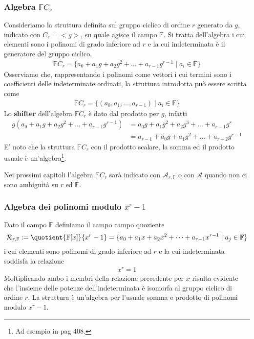 \subsubsection{Algebra $\mathbb{F}C_{r}$}
Consideriamo la struttura definita sul gruppo ciclico di ordine
$r$ generato da $g$, indicato con $C_{r} = < g >$, su quale agisce il campo
$\mathbb{F}$. 
Si tratta dell'algebra i cui elementi sono i polinomi di grado
inferiore ad $r$ e la cui indeterminata è il generatore del gruppo ciclico.
\begin{align*}
\mathbb{F}C_{r} = \lbrace
a_0 + a_1 g + a_2 g^2 + \dots + a_{r-1} g^{r-1}
\mid a_{i} \in \mathbb{F}
\rbrace
\end{align*}
Osserviamo che, rappresentando i polinomi come vettori i cui
termini sono i coefficienti delle indeterminate ordinati, la
struttura introdotta può essere scritta come
\begin{align*}
\mathbb{F}C_r = \lbrace (a_0, a_1, \dots, a_{r-1} ) \mid a_{i} \in \mathbb{F}
\rbrace
\end{align*}
Lo {\bf shifter} dell'algebra $\mathbb{F}C_{r}$ è dato dal prodotto per $g$, infatti 
\begin{align*}
g(a_0 + a_1 g + a_2 g^2 + \dots + a_{r-1} g^{r-1} ) 
&= a_0 g + a_1 g^2 + a_2 g^3 + \dots + a_{r-1} g^{r} 
\\
&= a_{r-1} + a_0 g + a_1 g^2 + \dots + a_{r-2} g^{r-1}
\end{align*}
E' noto che la struttura $\mathbb{F}C_{r}$ con il prodotto scalare, la somma
ed il prodotto usuale è un'algebra\footnote{Ad esempio in \cite{jacobson} pag $408$.}.

Nei prossimi capitoli l'algebra $\mathbb{F}C_{r}$ sarà indicato con 
$\mathcal{A}_{r, \mathbb{F}}$ o con $\mathcal{A} $ quando non ci sono
ambiguità su $r$ ed $\mathbb{F}$.

\subsubsection{Algebra dei polinomi modulo $x^{r} -1$}

Dato il campo $\mathbb{F}$ definiamo il campo campo quoziente
\begin{align*}
\mathcal{R}_{r, \mathbb{F}} := \quotient{\mathbb{F} \lbrack x \rbrack  }{ x^{r}
- 1} = \lbrace a_0 + a_1 x + a_2 x^2 + \dots + a_{r-1} x^{r-1} \mid a_{j} \in \mathbb{F} \rbrace
\end{align*}
i cui elementi sono polinomi di grado inferiore ad
$r$ e la cui indeterminata soddisfa la relazione 
\begin{align*}
x^r = 1
\end{align*}
Moltiplicando ambo i membri della relazione precedente per $x$ risulta evidente
che l'insieme delle potenze dell'indeterminata è isomorfa al gruppo ciclico di
ordine $r$. La struttura è un'algebra per l'usuale somma e prodotto di
polinomi modulo $x^{r} - 1$. 

